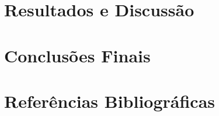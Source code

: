 \documentclass[11pt]{article}
\begin{document}
\paragraph{}

\newpage
\section{Resultados e Discussão}
\paragraph{}

\newpage
\section{Conclusões Finais}
\paragraph{}

\newpage
\section{Referências Bibliográficas}


\end{document}
